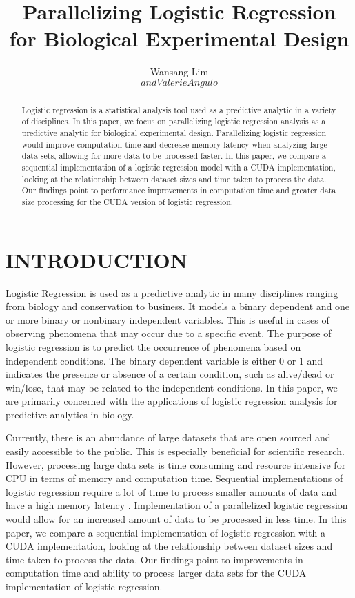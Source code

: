 \documentclass[letterpaper, 10 pt, conference]{ieeeconf}  %
\title{\LARGE \bf
Parallelizing Logistic Regression for Biological Experimental Design
}
\author{Wansang Lim$$ and Valerie Angulo$$%
}
\begin{document}
\maketitle
\thispagestyle{empty}
\pagestyle{empty}


\begin{abstract} 
Logistic regression is a statistical analysis tool used as a predictive analytic in a variety of disciplines. In this paper, we focus on parallelizing logistic regression analysis as a predictive analytic for biological experimental design. Parallelizing logistic regression would improve computation time and decrease memory latency when analyzing large data sets, allowing for more data to be processed faster. In this paper, we compare a sequential implementation of a logistic regression model with a CUDA implementation, looking at the relationship between dataset sizes and time taken to process the data. Our findings point to performance improvements in computation time and greater data size processing for the CUDA version of logistic regression.

\end{abstract}


\section{INTRODUCTION}

Logistic Regression is used as a predictive analytic in many disciplines ranging from biology and conservation to business. It models a binary dependent and one or more binary or nonbinary independent variables. This is useful in cases of observing phenomena that may occur due to a specific event. The purpose of logistic regression is to predict the occurrence of phenomena based on independent conditions. The binary dependent variable is either 0 or 1 and indicates the presence or absence of a certain condition, such as alive/dead or win/lose, that may be related to the independent conditions. In this paper, we are primarily concerned with the applications of logistic regression analysis for predictive analytics in biology.

Currently, there is an abundance of large datasets that are open sourced and easily accessible to the public. This is especially beneficial for scientific research. However, processing large data sets is time consuming and resource intensive for CPU in terms of memory and computation time. Sequential implementations of logistic regression require a lot of time to process smaller amounts of data and have a high memory latency \cite{c2}. Implementation of a parallelized logistic regression would allow for an increased amount of data to be processed in less time. In this paper, we compare a sequential implementation of logistic regression with a CUDA implementation, looking at the relationship between dataset sizes and time taken to process the data. Our findings point to improvements in computation time and ability to process larger data sets for the CUDA implementation of logistic regression.
\end{document}
